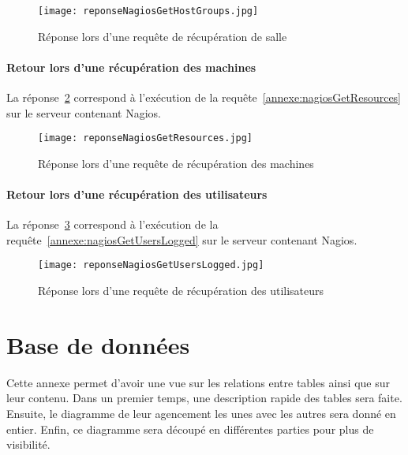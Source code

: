 \begin{appendices}
\begin{figure}[!ht]
	\centering
	\texttt{[image: reponseNagiosGetHostGroups.jpg]}
	\caption{R\'eponse lors d'une requ\^ete de r\'ecup\'eration de salle}
	\label{annexe:reponseNagiosGetHostGroups}

\end{figure}

\subsubsection{Retour lors d'une r\'ecup\'eration des machines}

La r\'eponse~\ref{annexe:reponseNagiosGetResources} correspond \`a l'ex\'ecution de la requ\^ete~\ref{annexe:nagiosGetResources} sur le serveur contenant Nagios.

\begin{figure}[!ht]
	\centering
	\texttt{[image: reponseNagiosGetResources.jpg]}
	\caption{R\'eponse lors d'une requ\^ete de r\'ecup\'eration des machines}
	\label{annexe:reponseNagiosGetResources}

\end{figure}

\subsubsection{Retour lors d'une r\'ecup\'eration des utilisateurs}

La r\'eponse~\ref{annexe:reponseNagiosGetUsersLogged} correspond \`a l'ex\'ecution de la requ\^ete~\ref{annexe:nagiosGetUsersLogged} sur le serveur contenant Nagios.

\begin{figure}[!ht]
	\centering
	\texttt{[image: reponseNagiosGetUsersLogged.jpg]}
	\caption{R\'eponse lors d'une requ\^ete de r\'ecup\'eration des utilisateurs}
	\label{annexe:reponseNagiosGetUsersLogged}

\end{figure}

\chapter{Base de donn\'ees}
\label{chapterAnnexe:baseDeDonnees}

Cette annexe permet d'avoir une vue sur les relations entre tables ainsi que sur leur contenu.
Dans un premier temps, une description rapide des tables sera faite.
Ensuite, le diagramme de leur agencement les unes avec les autres sera donn\'e en entier.
Enfin, ce diagramme sera d\'ecoup\'e en diff\'erentes parties pour plus de visibilit\'e.


\end{appendices}
